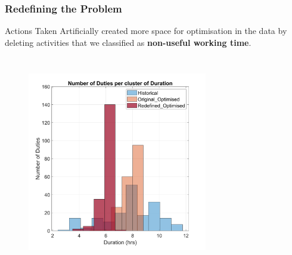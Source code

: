 \documentclass[handout]{beamer}
\begin{document}
\begin{frame}
	\frametitle{Redefining the Problem}
	\vspace{\baselineskip}
	
	\begin{block}{Actions Taken}
		Artificially created more space for optimisation in the data by deleting activities that we classified as \textbf{non-useful working time}. 
	\end{block}
	
	\begin{columns}[]
			\centering
	   	\begin{figure}%
        \centering
        \includegraphics[width=0.7\textwidth]{Images/1-D2M1.png}
        \label{fig:1-D2M1}%
    \end{figure} 
	\end{columns}
    
\end{frame}
\end{document}
